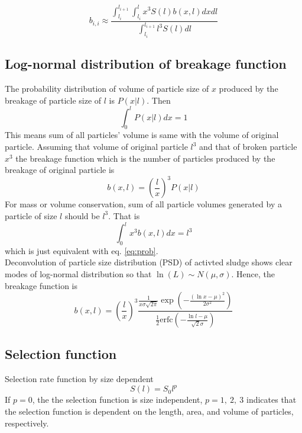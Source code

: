 \documentclass[12pt]{article}
\begin{document}
\begin{equation}
b_{i,i}\approx\frac{\int_{l_i}^{l_{i+1}}\int_{l_i}^lx^3S(l)b(x,l)dxdl}{\int_{l_i}^{l_{i+1}}l^3S(l)dl}
\end{equation}

\subsection{Log-normal distribution of breakage function}
The probability distribution of volume of particle size of $x$ produced by the breakage of particle size of $l$ is $P(x|l)$. Then
\begin{equation} \label{eq:prob}
\int_0^lP(x|l)dx=1
\end{equation}
This means sum of all particles' volume is same with the volume of original particle. Assuming that volume of original particle $l^3$ and that of broken particle $x^3$ the breakage function which is the number of particles produced by the breakage of original particle is
\begin{equation}
b(x,l)=\left(\frac{l}{x}\right)^3P(x|l)
\end{equation}
For mass or volume conservation, sum of all particle volumes generated by a particle of size $l$ should be $l^3$. That is
\begin{equation}
\int_0^lx^3b(x,l)dx=l^3
\end{equation}
which is just equivalent with eq. \ref{eq:prob}.\\
Deconvolution of particle size distribution (PSD) of activted sludge shows clear modes of log-normal distribution so that $\ln(L)\sim N(\mu,\sigma)$. Hence, the breakage function is
\begin{equation}
b(x,l)=\left(\frac{l}{x}\right)^3\frac{\frac{1}{x\sigma\sqrt{2\pi}}\exp\left(-\frac{\left(\ln x-\mu\right)^2}{2\sigma^2}\right)}{\frac{1}{2}\text{erfc}\left(-\frac{\ln l-\mu}{\sqrt{2}\sigma}\right)}
\end{equation}

\subsection{Selection function}
Selection rate function by size dependent
\begin{equation}
S(l)=S_0l^p
\end{equation}
If $p=0$, the the selection function is size independent, $p=1,~2,~3$ indicates that the selection function is dependent on the length, area, and volume of particles, respectively.
\end{document}
